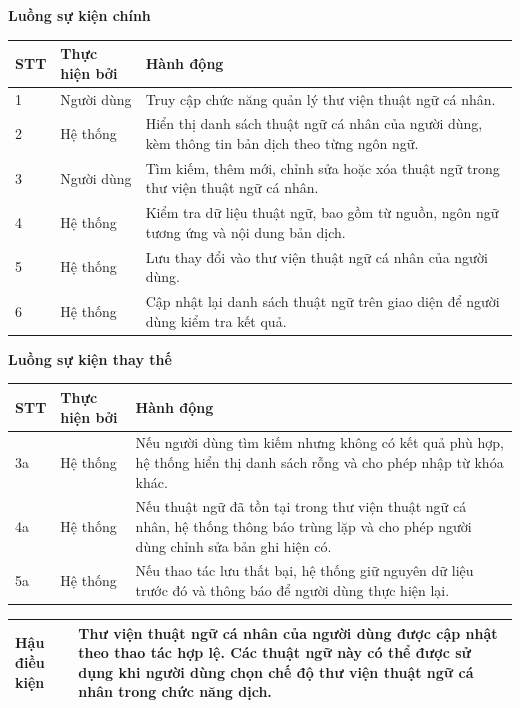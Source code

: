 \documentclass[../DoAn.tex]{subfiles}
\begin{document}
\textbf{Luồng sự kiện chính}

\begin{longtable}{|p{1cm}|p{3.3cm}|p{10.2cm}|}
\hline
\textbf{STT} & \textbf{Thực hiện bởi} & \textbf{Hành động} \\ \hline
1 & Người dùng & Truy cập chức năng quản lý thư viện thuật ngữ cá nhân. \\ \hline
2 & Hệ thống & Hiển thị danh sách thuật ngữ cá nhân của người dùng, kèm thông tin bản dịch theo từng ngôn ngữ. \\ \hline
3 & Người dùng & Tìm kiếm, thêm mới, chỉnh sửa hoặc xóa thuật ngữ trong thư viện thuật ngữ cá nhân. \\ \hline
4 & Hệ thống & Kiểm tra dữ liệu thuật ngữ, bao gồm từ nguồn, ngôn ngữ tương ứng và nội dung bản dịch. \\ \hline
5 & Hệ thống & Lưu thay đổi vào thư viện thuật ngữ cá nhân của người dùng. \\ \hline
6 & Hệ thống & Cập nhật lại danh sách thuật ngữ trên giao diện để người dùng kiểm tra kết quả. \\ \hline
\end{longtable}

\textbf{Luồng sự kiện thay thế}

\begin{longtable}{|p{1cm}|p{3.3cm}|p{10.2cm}|}
\hline
\textbf{STT} & \textbf{Thực hiện bởi} & \textbf{Hành động} \\ \hline
3a & Hệ thống & Nếu người dùng tìm kiếm nhưng không có kết quả phù hợp, hệ thống hiển thị danh sách rỗng và cho phép nhập từ khóa khác. \\ \hline
4a & Hệ thống & Nếu thuật ngữ đã tồn tại trong thư viện thuật ngữ cá nhân, hệ thống thông báo trùng lặp và cho phép người dùng chỉnh sửa bản ghi hiện có. \\ \hline
5a & Hệ thống & Nếu thao tác lưu thất bại, hệ thống giữ nguyên dữ liệu trước đó và thông báo để người dùng thực hiện lại. \\ \hline
\end{longtable}

\begin{longtable}{|p{4cm}|p{10.5cm}|}
\hline
\textbf{Hậu điều kiện} & Thư viện thuật ngữ cá nhân của người dùng được cập nhật theo thao tác hợp lệ. Các thuật ngữ này có thể được sử dụng khi người dùng chọn chế độ thư viện thuật ngữ cá nhân trong chức năng dịch. \\ \hline
\end{longtable}
\end{document}
